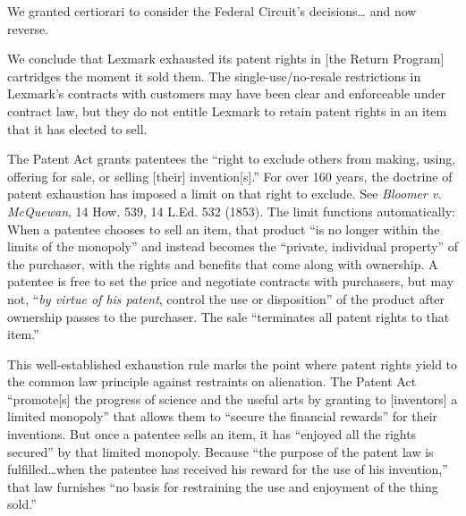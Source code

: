We granted certiorari to consider the Federal Circuit's decisions\ldots
and now reverse.







We conclude that Lexmark exhausted its patent rights in [the Return Program]
cartridges
the moment it sold them. The single-use/no-resale restrictions in Lexmark's
contracts with customers may have been clear and enforceable under contract law,
but they do not entitle Lexmark to retain patent rights in an item that it has
elected to sell.

The Patent Act grants patentees the ``right to exclude others from making,
using, offering for sale, or selling [their] invention[s].''
For over 160 years, the doctrine of patent exhaustion has imposed a
limit on that right to exclude. See \textit{Bloomer v. McQuewan}, 14 How. 539,
14 L.Ed. 532 (1853). The limit functions automatically: When a patentee chooses
to sell an item, that product ``is no longer within the limits of the monopoly''
and instead becomes the ``private, individual property'' of the purchaser, with
the rights and benefits that come along with ownership.
A patentee is free to set the price and negotiate contracts with
purchasers, but may not, ``\textit{by virtue of his patent}, control the use or
disposition'' of the product after ownership passes to the purchaser.
The sale ``terminates all patent rights to
that item.''

This well-established exhaustion rule marks the point where patent rights yield
to the common law principle against restraints on alienation. The Patent Act
``promote[s] the progress of science and the useful arts by granting to
[inventors] a limited monopoly'' that allows them to ``secure the financial
rewards'' for their inventions. But once a patentee sells an item, it has
``enjoyed all the rights secured'' by that limited monopoly. Because ``the
purpose of the patent law is fulfilled\ldots when the patentee has received his
reward for the use of his invention,'' that law furnishes ``no basis for
restraining the use and enjoyment of the thing sold.''

